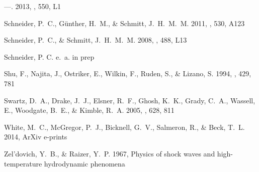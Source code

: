 \documentclass[manuscript]{aastex}
\begin{document}
\begin{thebibliography}{53}
---. 2013{}, \aap, 550, L1

{Schneider}, P.~C., {G{\"u}nther}, H.~M., \& {Schmitt}, J.~H.~M.~M. 2011, \aap,
  530, A123

{Schneider}, P.~C., \& {Schmitt}, J.~H.~M.~M. 2008, \aap, 488, L13

{Schneider}, P. C. e.~a. in prep

{Shu}, F., {Najita}, J., {Ostriker}, E., {Wilkin}, F., {Ruden}, S., \&
  {Lizano}, S. 1994, \apj, 429, 781

{Swartz}, D.~A., {Drake}, J.~J., {Elsner}, R.~F., {Ghosh}, K.~K., {Grady},
  C.~A., {Wassell}, E., {Woodgate}, B.~E., \& {Kimble}, R.~A. 2005, \apj, 628,
  811

{White}, M.~C., {McGregor}, P.~J., {Bicknell}, G.~V., {Salmeron}, R., \&
  {Beck}, T.~L. 2014, ArXiv e-prints

{Zel'dovich}, Y.~B., \& {Raizer}, Y.~P. 1967, {Physics of shock waves and
  high-temperature hydrodynamic phenomena}

\end{thebibliography}
\end{document}
